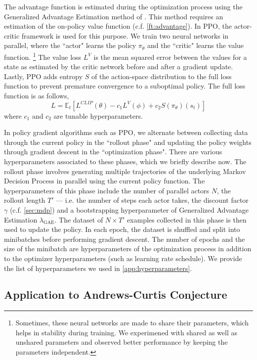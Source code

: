 The advantage function is estimated during the optimization process using the Generalized Advantage Estimation method of 
\cite{schulman2018highdimensional}. 
This method requires an estimation of the on-policy value function (c.f. \autoref{ft:advantage}). In PPO, the actor-critic framework is used for this purpose. We train two neural networks in parallel, where the ``actor" learns the policy $\pi_\theta$ and the ``critic" learns the value function.
\footnote{
Sometimes, these neural networks are made to share their parameters, which helps in stability during training. We experimened with shared as well as unshared parameters and observed better performance by keeping the parameters independent.
}
The value loss $L^V$ is the mean squared error between the values for a state as estimated by the critic network before and after a gradient update.
Lastly, PPO adds entropy $S$ of the action-space distribution to the full loss function to prevent premature convergence to a suboptimal policy. The full loss function is as follows,
\[
L = \mathbb{E}_{t} [L^{CLIP}(\theta) - c_1 L^{V}(\phi) + c_2 S(\pi_\theta)(s_t)]
\]
where $c_1$ and $c_2$ are tunable hyperparameters.
\newline 

In policy gradient algorithms such as PPO, we alternate between collecting data through the current policy in the ``rollout phase" and updating the policy weights through gradient descent in the ``optimization phase". There are various hyperparameters associated to these phases, which we briefly describe now. The rollout phase involves generating multiple trajectories of the underlying Markov Decision Process in parallel using the current policy function. The hyperparameters of this phase include the number of parallel actors $N$, the rollout length $T'$ --- i.e. the number of steps each actor takes, the discount factor $\gamma$ (c.f. \autoref{sec:mdp}) and a bootstrapping hyperparameter of Generalized Advantage Estimation $\lambda_{\text{GAE}}$. The dataset of $N \times T'$ examples collected in this phase is then used to update the policy. In each epoch, the dataset is shuffled and split into minibatches before performing gradient descent. The number of epochs and the size of the minibatch are hyperparameters of the optimization process in addition to the optimizer hyperparameters (such as learning rate schedule). We provide the list of hyperparameters we used in  \autoref{app:hyperparameters}.


\subsection{Application to Andrews-Curtis Conjecture} \label{sec:application}

